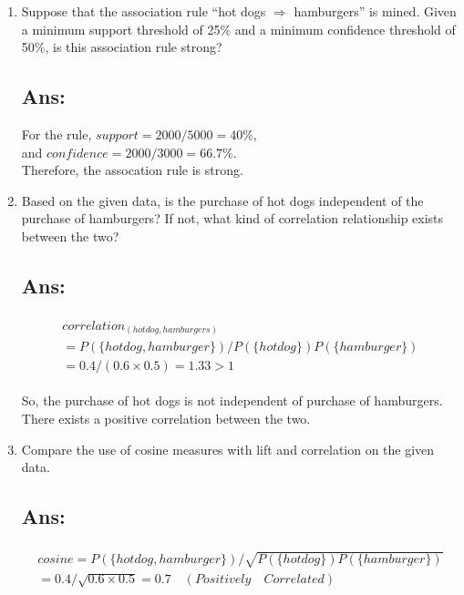 \begin{enumerate}[label=(\alph*)]

	\item Suppose that the association rule ``hot dogs $\Rightarrow$ hamburgers'' is mined. 
	Given a minimum support threshold of 25\% and a minimum confidence threshold of 50\%, 
	is this association rule strong?

	\subsection*{Ans:}

	For the rule, $support = 2000/5000 = 40\%$, \\
	and $confidence = 2000/3000 = 66.7\%$. \\
	Therefore, the assocation rule is strong.

	\item Based on the given data, is the purchase of hot dogs independent of 
	the purchase of hamburgers? If not, 
	what kind of correlation relationship exists between the two?

	\subsection*{Ans:}

	\begin{align*}
	\begin{gathered}
		correlation_{(hot dog, hamburgers)} \\
		= P(\{hot dog, hamburger\}) / P(\{hot dog\}) P(\{hamburger\}) \\
		= 0.4 / (0.6 \times 0.5) = 1.33 > 1
	\end{gathered}
	\end{align*}

	So, the purchase of hot dogs is not independent of purchase of hamburgers.
	There exists a positive correlation between the two.

	\item Compare the use of cosine measures with lift and correlation on the given data.
	
	\subsection*{Ans:}

	\begin{align*}
	\begin{gathered}
		cosine = P(\{hot dog, hamburger\}) / \sqrt{P(\{hot dog\}) P(\{hamburger\})} \\
		= 0.4 / \sqrt{0.6 \times 0.5} = 0.7 \quad (Positively \quad Correlated)  \\
	\end{gathered}
	\end{align*}

\end{enumerate}


